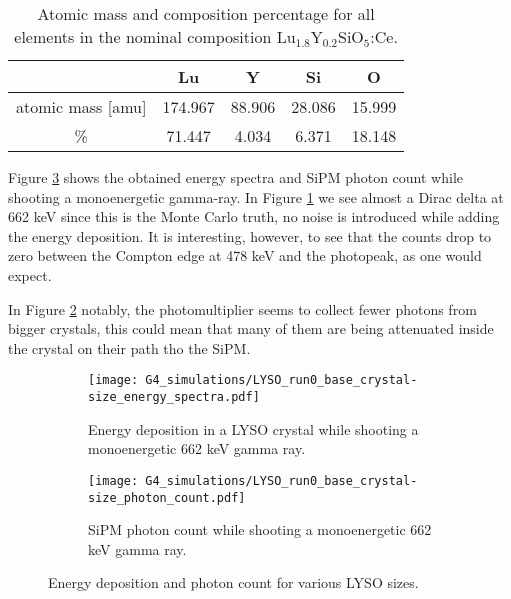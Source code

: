 \begin{table}[H]
  \caption{Atomic mass and composition percentage for all elements in the nominal composition Lu$_{1.8}$Y$_{0.2}$SiO$_5$:Ce.}
  \centering
  \begin{tabular}{ c c c c c}
    \midrule
     & Lu & Y & Si & O \\
    \midrule
    atomic mass [amu] & 174.967 & 88.906 & 28.086 & 15.999 \\
    \% & 71.447 & 4.034 & 6.371 & 18.148 \\
    \bottomrule
  \end{tabular}
  \label{tab:LYSO_composition}
\end{table}

Figure \ref{fig:LYSO_size_results} shows the obtained energy spectra and SiPM photon count while shooting a monoenergetic gamma-ray. In Figure \ref{sfig:LYSO_size_edep} we see almost a Dirac delta at 662 \unit{\kilo\eV} since this is the Monte Carlo truth, no noise is introduced while adding the energy deposition. It is interesting, however, to see that the counts drop to zero between the Compton edge at 478 \unit{\kilo\eV} and the photopeak, as one would expect.

In Figure \ref{sfig:LYSO_size_pcount} notably, the photomultiplier seems to collect fewer photons from bigger crystals, this could mean that many of them are being attenuated inside the crystal on their path tho the SiPM.

\begin{figure}
  \centering
  \begin{subfigure}[t]{0.48\textwidth}
    \texttt{[image: G4\_simulations/LYSO\_run0\_base\_crystal-size\_energy\_spectra.pdf]}
    \caption{\label{sfig:LYSO_size_edep}Energy deposition in a LYSO crystal while shooting a monoenergetic 662 \unit{\kilo\eV} gamma ray.}
  \end{subfigure}
  \hfill
  \begin{subfigure}[t]{0.48\textwidth}
    \texttt{[image: G4\_simulations/LYSO\_run0\_base\_crystal-size\_photon\_count.pdf]}
    \caption{\label{sfig:LYSO_size_pcount}SiPM photon count while shooting a monoenergetic 662 \unit{\kilo\eV} gamma ray.}
  \end{subfigure}
  \caption{\label{fig:LYSO_size_results}Energy deposition and photon count for various LYSO sizes.}
\end{figure}
